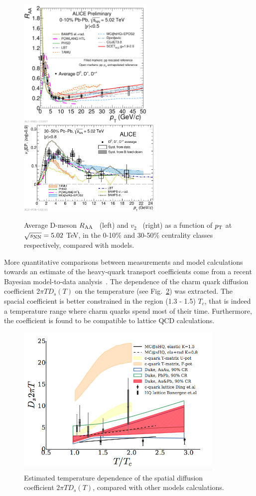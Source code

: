 \begin{figure}[!ht]
  \centering
    \includegraphics[width=6.5cm]{FigCap2/2017-Jul-07-DmesonAverage_010_All_Models_04July2017.pdf}
    \includegraphics[width=7cm]{FigCap2/2017-Jul-04-DmesonComparisonWithModels.pdf}
  \caption{Average D-meson $R_{\rm AA}$~\cite{ALICE-PUBLIC-2017-003} (left) and $v_2$~\cite{Acharya:2017qps} (right) as a function of $p_{\rm T}$ at $\sqrt{s_{\rm NN}} = 5.02$ TeV, in the 0-10\% and 30-50\% centrality classes respectively, compared with models.}
  \label{fig:RAAandv2}
\end{figure}

More quantitative comparisons between measurements and model
calculations towards an estimate of the heavy-quark transport coefficients
come from a recent Bayesian model-to-data analysis~\cite{Xu:2017hgt}. 
The dependence of the charm quark diffusion coefficient 2$\pi T D_s(T)$ on the temperature 
(see Fig.~\ref{fig:DiffCoeff}) was extracted.
The spacial coefficient is better constrained in the region (1.3 - 1.5) $T_c$, that is indeed a 
temperature range where charm quarks spend most of their time.
Furthermore, the coefficient is found to be compatible to lattice QCD calculations.

\begin{figure}[!ht]
  \centering
    \includegraphics[width=10cm]{FigCap2/DiffCoeff.png}
  \caption{Estimated temperature dependence of the spatial diffusion coefficient  2$\pi T D_s(T)$, compared with other models calculations.}
  \label{fig:DiffCoeff}
\end{figure}


